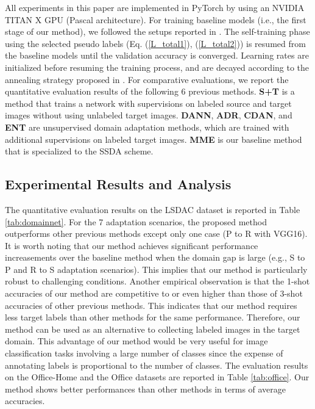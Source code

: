 \documentclass[a4paper,conference]{IEEEtran}
\begin{document}
All experiments in this paper are implemented in PyTorch \cite{pytorch} by using an NVIDIA TITAN X GPU (Pascal architecture). For training baseline models (i.e., the first stage of our method), we followed the setups reported in \cite{saito2019mme}. The self-training phase using the selected pseudo labels (Eq. (\ref{L_total1}), (\ref{L_total2})) is resumed from the baseline models until the validation accuracy is converged. Learning rates are initialized before resuming the training process, and are decayed according to the annealing strategy proposed in \cite{ganin2015dann}. For comparative evaluations, we report the quantitative evaluation results of the following 6 previous methods. \textbf{S+T}\cite{chen2019closer, ranjan2017l2} is a method that trains a network with supervisions on labeled source and target images without using unlabeled target images. \textbf{DANN}\cite{ganin2015dann}, \textbf{ADR}\cite{saito2017adversarial}, \textbf{CDAN}\cite{long2018cdan}, and \textbf{ENT}\cite{grandvalet2005semi} are unsupervised domain adaptation methods, which are trained with additional supervisions on labeled target images. \textbf{MME}\cite{saito2019mme} is our baseline method that is specialized to the SSDA scheme.








\subsection{Experimental Results and Analysis}
The quantitative evaluation results on the LSDAC dataset is reported in Table \ref{tab:domainnet}. For the 7 adaptation scenarios, the proposed method outperforms other previous methods except only one case (P to R with VGG16). It is worth noting that our method achieves significant performance increasements over the baseline method when the domain gap is large (e.g., S to P and R to S adaptation scenarios). This implies that our method is particularly robust to challenging conditions. Another empirical observation is that the 1-shot accuracies of our method are competitive to or even higher than those of 3-shot accuracies of other previous methods. This indicates that our method requires less target labels than other methods for the same performance. Therefore, our method can be used as an alternative to collecting labeled images in the target domain. This advantage of our method would be very useful for image classification tasks involving a large number of classes since the expense of annotating labels is proportional to the number of classes. The evaluation results on the Office-Home and the Office datasets are reported in Table \ref{tab:office}. Our method shows better performances than other methods in terms of average accuracies.
\end{document}
